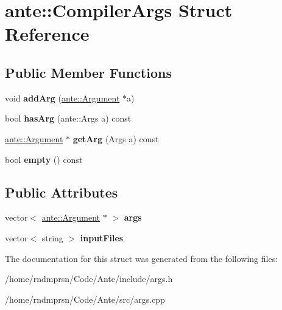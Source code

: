 \hypertarget{structante_1_1CompilerArgs}{}\section{ante\+:\+:Compiler\+Args Struct Reference}
\label{structante_1_1CompilerArgs}
\subsection*{Public Member Functions}
\begin{DoxyCompactItemize}
\item 
\mbox{\label{structante_1_1CompilerArgs_a4b02a7093a667857a6d0b4bee3c57742}} 
void {\bfseries add\+Arg} (\hyperlink{structante_1_1Argument}{ante\+::\+Argument} $\ast$a)
\item 
\mbox{\label{structante_1_1CompilerArgs_a60dbb66cc534d15cbecdc991a2d6c871}} 
bool {\bfseries has\+Arg} (ante\+::\+Args a) const
\item 
\mbox{\label{structante_1_1CompilerArgs_ae4035a9e649a8b840c28f04f0e392cfc}} 
\hyperlink{structante_1_1Argument}{ante\+::\+Argument} $\ast$ {\bfseries get\+Arg} (Args a) const
\item 
\mbox{\label{structante_1_1CompilerArgs_a6a7b95820e319131c49ed304251df89d}} 
bool {\bfseries empty} () const
\end{DoxyCompactItemize}
\subsection*{Public Attributes}
\begin{DoxyCompactItemize}
\item 
\mbox{\label{structante_1_1CompilerArgs_a8d860eace9837845dca99ebb4386098a}} 
vector$<$ \hyperlink{structante_1_1Argument}{ante\+::\+Argument} $\ast$ $>$ {\bfseries args}
\item 
\mbox{\label{structante_1_1CompilerArgs_a32b25fc8c83b0d49a9b5ad025848b55e}} 
vector$<$ string $>$ {\bfseries input\+Files}
\end{DoxyCompactItemize}


The documentation for this struct was generated from the following files\+:\begin{DoxyCompactItemize}
\item 
/home/rndmprsn/\+Code/\+Ante/include/args.\+h\item 
/home/rndmprsn/\+Code/\+Ante/src/args.\+cpp\end{DoxyCompactItemize}
